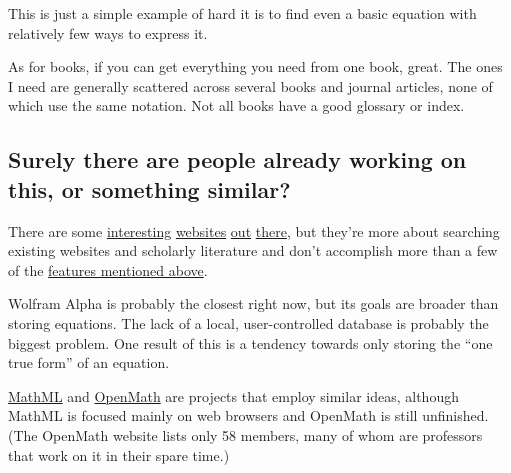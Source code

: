 \documentclass[12pt,letterpaper]{article}
\begin{document}

This is just a simple example of hard it is to find even a basic equation with relatively few ways to express it.


As for books, if you can get everything you need from one book, great.
The ones I need are generally scattered across several books and journal articles,
none of which use the same notation.
Not all books have a good glossary or index.

\subsection{Surely there are people already working on this, or something similar?}

There are some
\href{http://symbolab.com}
{interesting}
\href{http://latexsearch.com/}
{websites}
\href{http://www.dessci.com/en/reference/searching/math-searching.htm}
{out}
\href{http://www.equationsheet.com/}
{there},
but they're more about searching existing websites and scholarly literature
and don't accomplish more than a few of the \hyperref[sec:features]{features mentioned above}.



Wolfram Alpha is probably the closest right now,
but its goals are broader than storing equations.
The lack of a local, user-controlled database is probably the biggest problem.
One result of this is a tendency towards only storing the ``one true form'' of an equation.

\href{http://www.w3.org/Math/}
{MathML}
and
\href{http://www.openmath.org/}
{OpenMath} are projects that employ similar ideas,
although MathML is focused mainly on web browsers and OpenMath is still unfinished.
(The OpenMath website lists only 58 members,
many of whom are professors that work on it in their spare time.)
\end{document}
